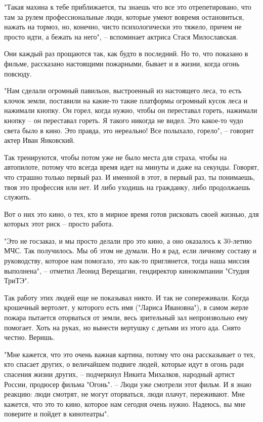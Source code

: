 "Такая махина к тебе приближается, ты знаешь что все это отрепетировано, что
там за рулем профессиональные люди, которые умеют вовремя остановиться, нажать
на тормоз, но, конечно, чисто психологически это тяжело, причем не просто идти,
а бежать на него", – вспоминает актриса Стася Милославская.

Они каждый раз прощаются так, как будто в последний. Но то, что показано в
фильме, рассказано настоящими пожарными, бывает и в жизни, когда огонь повсюду.

"Нам сделали огромный павильон, выстроенный из настоящего леса, то есть клочок
земли, поставили на какие-то такие платформы огромный кусок леса и нажимали
кнопку. Он горел, когда нужно, чтобы он переставал гореть, нажимали кнопку – он
переставал гореть. Я такого никогда не видел. Это какое-то чудо света было в
кино. Это правда, это нереально! Все полыхало, горело", – говорит актер Иван
Янковский.

Так тренируются, чтобы потом уже не было места для страха, чтобы на автопилоте,
потому что всегда время идет на минуты и даже на секунды. Говорят, что страшно
только первый раз. И именной в этот, в первый раз, ты понимаешь, твоя это
профессия или нет. И либо уходишь на гражданку, либо продолжаешь служить.

Вот о них это кино, о тех, кто в мирное время готов рисковать своей жизнью, для
которых этот риск – просто работа.

"Это не госзаказ, и мы просто делали про это кино, а оно оказалось к 30-летию
МЧС. Так получилось. Мы об этом не думали. Но я рад, если личному составу и
руководству, которое нам помогало, это как-то приглянется, тогда наша миссия
выполнена", – отметил Леонид Верещагин, гендиректор кинокомпании "Студия
ТриТЭ".

Так работу этих людей еще не показывал никто. И так не сопереживали. Когда
крошечный вертолет, у которого есть имя ("Лариса Ивановна"), в самом жерле
пожара пытается оторваться от земли, весь зрительный зал непроизвольно ему
помогает. Хоть на руках, но вынести вертушку с детьми из этого ада. Снято
честно. Веришь.

"Мне кажется, что это очень важная картина, потому что она рассказывает о тех,
кто спасает других, о величайшем подвиге людей, которые идут в огонь ради
спасения жизни других, – подчеркнул Никита Михалков, народный артист России,
продюсер фильма "Огонь". – Люди уже смотрели этот фильм. И я знаю реакцию: люди
смотрят, не могут оторваться, люди плачут, переживают. Мне кажется, что это то
кино, которое нам сегодня очень нужно. Надеюсь, вы мне поверите и пойдет в
кинотеатры".

